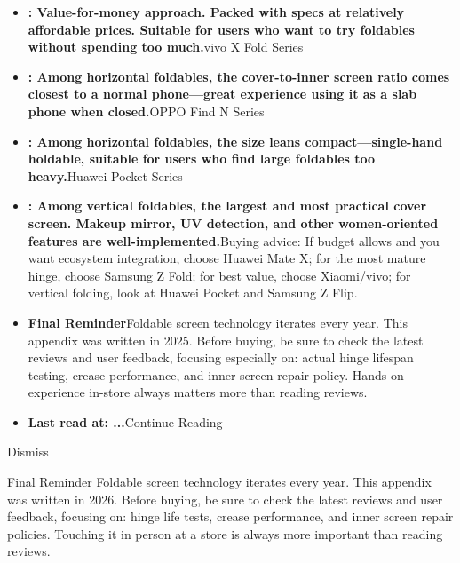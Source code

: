 \begin{itemize}
  \item \textbf{: Value-for-money approach. Packed with specs at relatively affordable prices. Suitable for users who want to try foldables without spending too much.}vivo X Fold Series
  \item \textbf{: Among horizontal foldables, the cover-to-inner screen ratio comes closest to a normal phone—great experience using it as a slab phone when closed.}OPPO Find N Series
  \item \textbf{: Among horizontal foldables, the size leans compact—single-hand holdable, suitable for users who find large foldables too heavy.}Huawei Pocket Series
  \item \textbf{: Among vertical foldables, the largest and most practical cover screen. Makeup mirror, UV detection, and other women-oriented features are well-implemented.}Buying advice: If budget allows and you want ecosystem integration, choose Huawei Mate X; for the most mature hinge, choose Samsung Z Fold; for best value, choose Xiaomi/vivo; for vertical folding, look at Huawei Pocket and Samsung Z Flip.
  \item \textbf{Final Reminder}Foldable screen technology iterates every year. This appendix was written in 2025. Before buying, be sure to check the latest reviews and user feedback, focusing especially on: actual hinge lifespan testing, crease performance, and inner screen repair policy. Hands-on experience in-store always matters more than reading reviews.
  \item \textbf{Last read at: ...}Continue Reading
\end{itemize}

Dismiss

\begin{tcbinfo}{Final Reminder}
Foldable screen technology iterates every year. This appendix was written in 2026. Before buying, be sure to check the latest reviews and user feedback, focusing on: hinge life tests, crease performance, and inner screen repair policies. Touching it in person at a store is always more important than reading reviews.

\end{tcbinfo}
